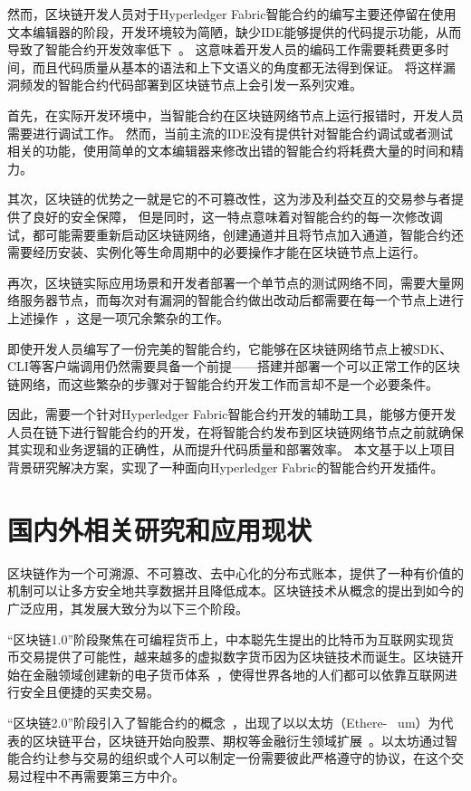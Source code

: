 然而，区块链开发人员对于Hyperledger Fabric智能合约的编写主要还停留在使用文本编辑器的阶段，开发环境较为简陋，缺少IDE能够提供的代码提示功能，从而导致了智能合约开发效率低下~\cite{罗雄2020}。
这意味着开发人员的编码工作需要耗费更多时间，而且代码质量从基本的语法和上下文语义的角度都无法得到保证。
将这样漏洞频发的智能合约代码部署到区块链节点上会引发一系列灾难。

首先，在实际开发环境中，当智能合约在区块链网络节点上运行报错时，开发人员需要进行调试工作。
然而，当前主流的IDE没有提供针对智能合约调试或者测试相关的功能，使用简单的文本编辑器来修改出错的智能合约将耗费大量的时间和精力。

其次，区块链的优势之一就是它的不可篡改性，这为涉及利益交互的交易参与者提供了良好的安全保障，
但是同时，这一特点意味着对智能合约的每一次修改调试，都可能需要重新启动区块链网络，创建通道并且将节点加入通道，智能合约还需要经历安装、实例化等生命周期中的必要操作才能在区块链节点上运行。

再次，区块链实际应用场景和开发者部署一个单节点的测试网络不同，需要大量网络服务器节点，而每次对有漏洞的智能合约做出改动后都需要在每一个节点上进行上述操作~\cite{XiaozhouYang}，这是一项冗余繁杂的工作。

即使开发人员编写了一份完美的智能合约，它能够在区块链网络节点上被SDK、CLI等客户端调用仍然需要具备一个前提——搭建并部署一个可以正常工作的区块链网络，而这些繁杂的步骤对于智能合约开发工作而言却不是一个必要条件。

因此，需要一个针对Hyperledger Fabric智能合约开发的辅助工具，能够方便开发人员在链下进行智能合约的开发，在将智能合约发布到区块链网络节点之前就确保其实现和业务逻辑的正确性，从而提升代码质量和部署效率。
本文基于以上项目背景研究解决方案，实现了一种面向Hyperledger Fabric的智能合约开发插件。

\section{国内外相关研究和应用现状}

区块链作为一个可溯源、不可篡改、去中心化的分布式账本，提供了一种有价值的机制可以让多方安全地共享数据并且降低成本。区块链技术从概念的提出到如今的广泛应用，其发展大致分为以下三个阶段。

“区块链1.0”阶段聚焦在可编程货币上，中本聪先生提出的比特币为互联网实现货币交易提供了可能性，越来越多的虚拟数字货币因为区块链技术而诞生。区块链开始在金融领域创建新的电子货币体系~\cite{DBLP:journals/hmd/Portmann18b}，使得世界各地的人们都可以依靠互联网进行安全且便捷的买卖交易。

“区块链2.0”阶段引入了智能合约的概念~\cite{Sheikh}，出现了以以太坊（Ethere- ~\linebreak um）为代表的区块链平台，区块链开始向股票、期权等金融衍生领域扩展~\cite{2015Blockchain}。以太坊通过智能合约让参与交易的组织或个人可以制定一份需要彼此严格遵守的协议，在这个交易过程中不再需要第三方中介。

